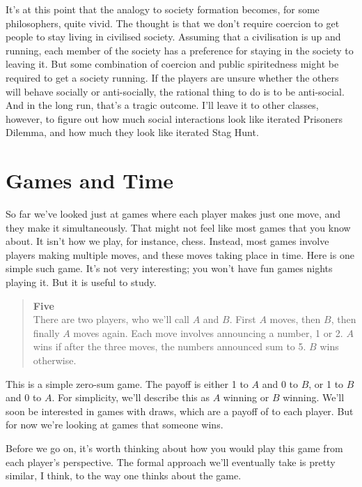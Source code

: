 \documentclass[
  11pt,
  letterpaper,
]{scrbook}
\begin{document}
It's at this point that the analogy to society formation becomes, for
some philosophers, quite vivid. The thought is that we don't require
coercion to get people to stay living in civilised society. Assuming
that a civilisation is up and running, each member of the society has a
preference for staying in the society to leaving it. But some
combination of coercion and public spiritedness might be required to get
a society running. If the players are unsure whether the others will
behave socially or anti-socially, the rational thing to do is to be
anti-social. And in the long run, that's a tragic outcome. I'll leave it
to other classes, however, to figure out how much social interactions
look like iterated Prisoners Dilemma, and how much they look like
iterated Stag Hunt.


\chapter{Games and Time}\label{sec-games-and-time}

So far we've looked just at games where each player makes just one move,
and they make it simultaneously. That might not feel like most games
that you know about. It isn't how we play, for instance, chess. Instead,
most games involve players making multiple moves, and these moves taking
place in time. Here is one simple such game. It's not very interesting;
you won't have fun games nights playing it. But it is useful to study.

\begin{quote}
\textbf{Five}\\
There are two players, who we'll call \(A\) and \(B\). First \(A\)
moves, then \(B\), then finally \(A\) moves again. Each move involves
announcing a number, 1 or 2. \(A\) wins if after the three moves, the
numbers announced sum to 5. \(B\) wins otherwise.
\end{quote}

This is a simple zero-sum game. The payoff is either 1 to \(A\) and 0 to
\(B\), or 1 to \(B\) and 0 to \(A\). For simplicity, we'll describe this
as \(A\) winning or \(B\) winning. We'll soon be interested in games
with draws, which are a payoff of to each player. But for now we're
looking at games that someone wins.

Before we go on, it's worth thinking about how you would play this game
from each player's perspective. The formal approach we'll eventually
take is pretty similar, I think, to the way one thinks about the game.
\end{document}

